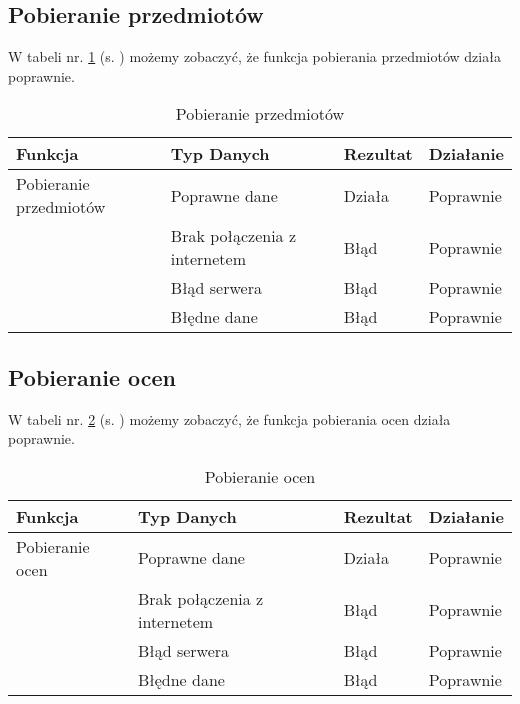 \subsection{Pobieranie przedmiotów}
W tabeli nr. \ref{tab:tabelka014} (s. \pageref{tab:tabelka014}) możemy zobaczyć, że funkcja pobierania przedmiotów działa poprawnie.
\begin{table}[h!]
	\centering
	\begin{tabularx}{\textwidth}{|X|>{\arraybackslash}m{}|X|X|}
		\hline
		\textbf{Funkcja}       & \textbf{Typ Danych}          & \textbf{Rezultat} & \textbf{Działanie} \\ \hline
		Pobieranie przedmiotów & Poprawne dane                & Działa            & Poprawnie          \\ \hline
		                       & Brak połączenia z internetem & Błąd              & Poprawnie          \\ \hline
		                       & Błąd serwera                 & Błąd              & Poprawnie          \\ \hline
		                       & Błędne dane                  & Błąd              & Poprawnie          \\ \hline
	\end{tabularx}
	\caption{Pobieranie przedmiotów}
	\label{tab:tabelka014}
\end{table}

\newpage
\subsection{Pobieranie ocen}
W tabeli nr. \ref{tab:tabelka015} (s. \pageref{tab:tabelka015}) możemy zobaczyć, że funkcja pobierania ocen działa poprawnie.
\begin{table}[h!]
	\centering
	\begin{tabularx}{\textwidth}{|X|>{\arraybackslash}m{}|X|X|}
		\hline
		\textbf{Funkcja} & \textbf{Typ Danych}          & \textbf{Rezultat} & \textbf{Działanie} \\ \hline
		Pobieranie ocen  & Poprawne dane                & Działa            & Poprawnie          \\ \hline
		                 & Brak połączenia z internetem & Błąd              & Poprawnie          \\ \hline
		                 & Błąd serwera                 & Błąd              & Poprawnie          \\ \hline
		                 & Błędne dane                  & Błąd              & Poprawnie          \\ \hline
	\end{tabularx}
	\caption{Pobieranie ocen}
	\label{tab:tabelka015}
\end{table}

